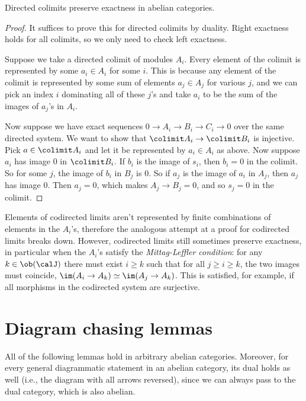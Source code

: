 \begin{prop}\label{prop direct limits preserve exactness}
    Directed colimits preserve exactness in abelian categories.
\end{prop}
\begin{proof}
    It suffices to prove this for directed colimits by duality. Right exactness holds for all colimits, so we only need to check left exactness.
    
    Suppose we take a directed colimit of modules $A_i$. Every element of the colimit is represented by some $a_i\in A_i$ for some $i$. This is because any element of the colimit is represented by some sum of elements $a_j\in A_j$ for various $j$, and we can pick an index $i$ dominating all of these $j$'s and take $a_i$ to be the sum of the images of $a_j$'s in $A_i$.

    Now suppose we have exact sequences $0\to A_i\to B_i\to C_i\to 0$ over the same directed system. We want to show that $\colimit A_i\to \colimit B_i$ is injective. Pick $a\in\colimit A_i$ and let it be represented by $a_i\in A_i$ as above. Now suppose $a_i$ has image $0$ in $\colimit B_i$. If $b_i$ is the image of $s_i$, then $b_i=0$ in the colimit. So for some $j$, the image of $b_i$ in $B_j$ is $0$. So if $a_j$ is the image of $a_i$ in $A_j$, then $a_j$ has image $0$. Then $a_j=0$, which makes $A_j\to B_j=0$, and so $s_j=0$ in the colimit.
\end{proof}
\begin{rem}
    Elements of codirected limits aren't represented by finite combinations of elements in the $A_i$'s, therefore the analogous attempt at a proof for codirected limits breaks down. However, codirected limits still sometimes preserve exactness, in particular when the $A_i$'s satisfy the \emph{Mittag-Leffler condition}: for any $k\in \ob(\calJ)$ there must exist $i\geq k$ such that for all $j\geq i\geq k$, the two images must coincide, $\im(A_i\to A_k)\simeq \im(A_j\to A_k)$. This is satisfied, for example, if all morphisms in the codirected system are surjective.
\end{rem}




\section{Diagram chasing lemmas}

All of the following lemmas hold in arbitrary abelian categories. Moreover, for every general diagrammatic statement in an abelian category, its dual holds as well (i.e., the diagram with all arrows reversed), since we can always pass to the dual category, which is also abelian.

